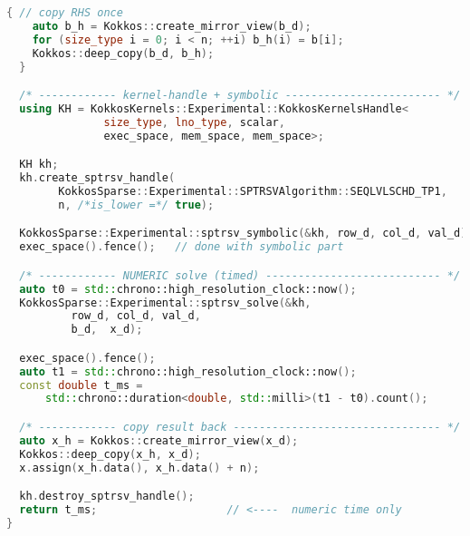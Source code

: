 \begin{lstlisting}[language=C++,caption={Full implementation of the
\texttt{kokkosSpTRSV} kernel.}]
  { // copy RHS once
    auto b_h = Kokkos::create_mirror_view(b_d);
    for (size_type i = 0; i < n; ++i) b_h(i) = b[i];
    Kokkos::deep_copy(b_d, b_h);
  }

  /* ------------ kernel-handle + symbolic ------------------------ */
  using KH = KokkosKernels::Experimental::KokkosKernelsHandle<
               size_type, lno_type, scalar,
               exec_space, mem_space, mem_space>;

  KH kh;
  kh.create_sptrsv_handle(
        KokkosSparse::Experimental::SPTRSVAlgorithm::SEQLVLSCHD_TP1,
        n, /*is_lower =*/ true);

  KokkosSparse::Experimental::sptrsv_symbolic(&kh, row_d, col_d, val_d);
  exec_space().fence();   // done with symbolic part

  /* ------------ NUMERIC solve (timed) --------------------------- */
  auto t0 = std::chrono::high_resolution_clock::now();
  KokkosSparse::Experimental::sptrsv_solve(&kh,
          row_d, col_d, val_d,
          b_d,  x_d);

  exec_space().fence();
  auto t1 = std::chrono::high_resolution_clock::now();
  const double t_ms =
      std::chrono::duration<double, std::milli>(t1 - t0).count();

  /* ------------ copy result back -------------------------------- */
  auto x_h = Kokkos::create_mirror_view(x_d);
  Kokkos::deep_copy(x_h, x_d);
  x.assign(x_h.data(), x_h.data() + n);

  kh.destroy_sptrsv_handle();
  return t_ms;                    // <----  numeric time only
}
\end{lstlisting}
